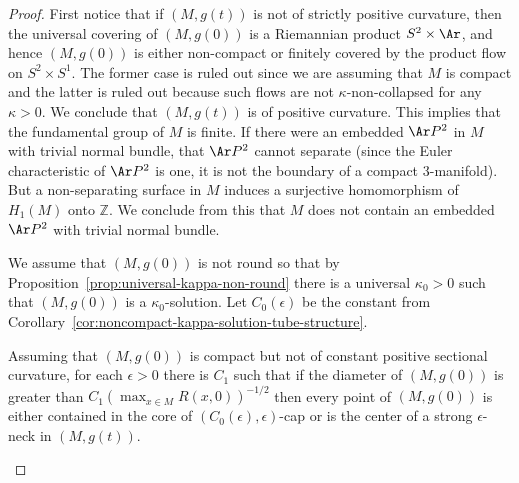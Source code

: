 \begin{proof}
First notice that if $(M,g(t))$ is not of strictly positive
curvature, then the universal covering of $(M,g(0))$ is a Riemannian
product $S^2\times \Ar$, and hence $(M,g(0))$ is either non-compact
or finitely covered by the product flow on $S^2\times S^1$. The
former case is ruled out since we are assuming that $M$ is compact
and the latter is ruled out because such flows are not
$\kappa$-non-collapsed for any $\kappa>0$. We conclude that
$(M,g(t))$ is of positive curvature. This implies that the
fundamental group of $M$ is finite. If there were an embedded $\Ar
P^2$ in $M$ with trivial normal bundle, that $\Ar P^2$ cannot
separate (since the Euler characteristic of $\Ar P^2$ is one, it is
not the boundary of a compact $3$-manifold). But a non-separating
surface in $M$ induces a surjective homomorphism of $H_1(M)$ onto
$\mathbb{Z}$. We conclude from this that $M$ does not contain an embedded
$\Ar P^2$ with trivial normal bundle.

 We assume that $(M,g(0))$ is not round so that by Proposition~\ref{prop:universal-kappa-non-round}
 there is a universal $\kappa_0>0$ such that $(M,g(0))$ is a
$\kappa_0$-solution. Let $C_0(\epsilon)$ be the constant from
 Corollary~\ref{cor:noncompact-kappa-solution-tube-structure}.


 \begin{claim}\label{claim:diameter-canonical-neighborhood-criterion}
Assuming that $(M,g(0))$ is compact but not of constant positive
sectional curvature, for each $\epsilon>0$ there is $C_1$ such that
if the diameter of $(M,g(0))$ is greater than $C_1(\max_{x\in
M}R(x,0))^{-1/2}$ then every point of $(M,g(0))$ is either contained
in the core of $(C_0(\epsilon),\epsilon)$-cap or is the center of a
strong $\epsilon$-neck in $(M,g(t))$.
\end{claim}


\end{proof}
